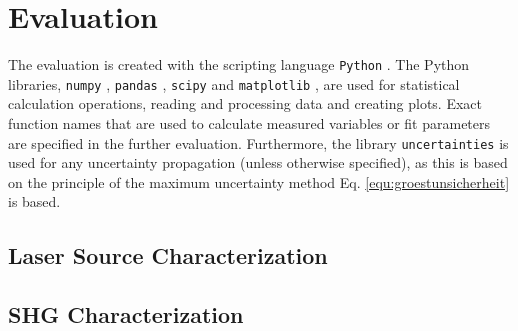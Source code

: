 \section{Evaluation}
\label{sec:evaluation}
The evaluation is created with the scripting language \verb|Python| \cite{PYTHON}.
The Python libraries, \verb|numpy| \cite{harris2020array}, \verb|pandas| \cite{reback2020pandas}, \verb|scipy| \cite{2020SciPy-NMeth} and \verb|matplotlib| \cite{Hunter:2007}, are used for statistical calculation operations, reading and processing data and creating plots.
Exact function names that are used to calculate measured variables or fit parameters are specified in the further evaluation.
Furthermore, the library \verb|uncertainties| \cite{UN} is used for any uncertainty propagation (unless otherwise specified), as this is based on the principle of the maximum uncertainty method Eq. \ref{equ:groestunsicherheit} is based.
\subsection{Laser Source Characterization}


\subsection{SHG Characterization}
